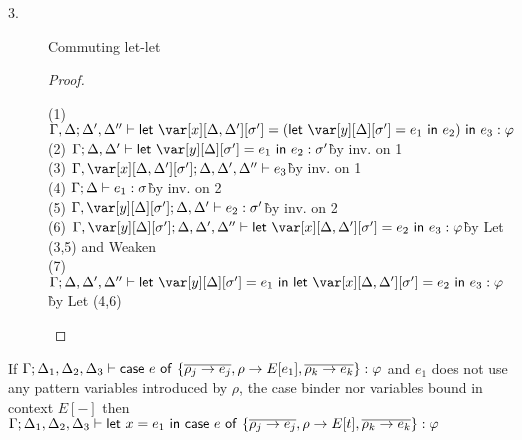 \begin{description}
\item[3.] Commuting let-let
\begin{proof}~
\begin{tabbing}
    (1) $\G, \D;\D',\D'' \vdash \llet{\x[\D,\D'][\s'] = (\llet{\yD = e_1}{e_2})}{e_3} : \vp$\\
    (2) $\G; \D, \D' \vdash \llet{\yD = e_1}{e_2} : \s'$\`by inv. on 1\\
    (3) $\G, \x[\D,\D'][\s'];\D,\D',\D'' \vdash e_3$\`by inv. on 1\\
    (4) $\Gamma; \Delta \vdash e_1 : \sigma$\`by inv. on 2\\
    (5) $\G, \yD; \D,\D' \vdash e_2 : \s'$\`by inv. on 2\\
    (6) $\G, \yD; \D,\D',\D'' \vdash \llet{\x[\D,\D'][\s'] = e_2}{e_3} : \vp$\`by Let (3,5) and Weaken\\
    (7) $\G; \D,\D',\D'' \vdash \llet{\yD = e_1}{\llet{\x[\D,\D'][\s'] = e_2}{e_3}} : \vp$\`by Let (4,6)\\
\end{tabbing}
\end{proof}
\end{description}




\begin{theorem}
If $\Gamma; \Delta_1,\Delta_2,\Delta_3 \vdash \mathsf{case}~e~\mathsf{of}~\{\overline{\rho_j\to e_j}, \rho \to
  E[e_1], \overline{\rho_k\to e_k}\}  : \varphi$ and $e_1$ does not
use any pattern variables introduced by $\rho$, the case binder nor variables bound in
context $E[{-}]$
then 
$\Gamma ; \Delta_1,\Delta_2,\Delta_3  \vdash \mathsf{let}~x = e_1~\mathsf{in}~\mathsf{case}~e~\mathsf{of}~\{\overline{\rho_j\to
           e_j}, \rho \to E[t], \overline{\rho_k\to e_k}\} : \varphi$
              
   \end{theorem}
   
